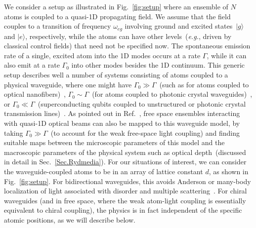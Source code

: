 \documentclass[pra,twocolumn,showpacs,preprintnumbers,amsmath,amssymb]{revtex4-1}
\begin{document}
We consider a setup as illustrated in Fig.~\ref{fig:setup} where an ensemble of  $N$ atoms is coupled to a quasi-1D propagating field. We assume that the field couples to a transition of frequency $\omega_{eg}$ involving ground and excited states~$|g\rangle$ and $|e\rangle$, respectively, while the atoms can have other levels~(\textit{e.g.}, driven by classical control fields) that need not be specified now. The spontaneous emission rate of a single, excited atom into the 1D modes occurs at a rate $\Gamma$, while it can also emit at a rate $\Gamma_0$ into other modes besides the 1D continuum. This generic setup describes well a number of systems consisting of atoms coupled to a physical waveguide, where one might have $\Gamma_0\gg \Gamma$~(such as for atoms coupled to optical nanofibers)~\cite{Prasadnat,ReitzPRL2013,Mitsch2014,Pablo2017}, $\Gamma_0\sim \Gamma$~(for atoms coupled to photonic crystal waveguides)~\cite{Arcari2014,Sollner2015,Goban2014,Hood2016}, or $\Gamma_0\ll \Gamma$~(superconducting qubits coupled to unstructured or photonic crystal transmission lines)~\cite{Sundaresan,painter1,painter2,ustinov,ustinov_topo,marcoBS}. As pointed out in Ref.~\cite{MPSJames}, free space ensembles interacting with quasi-1D optical beams can also be mapped to this waveguide model, by taking $\Gamma_0\gg\Gamma$~(to account for the weak free-space light coupling) and finding suitable maps between the microscopic parameters of this model and the macroscopic parameters of the physical system such as optical depth~(discussed in detail in Sec.~\ref{Sec.Rydmedia}). For our situations of interest, we can consider the waveguide-coupled atoms to be in an array of lattice constant $d$, as shown in Fig.~\ref{fig:setup}. For bidirectional waveguides, this avoids Anderson or many-body localization of light associated with disorder and multiple scattering~\cite{Anderson,ReviewManybodyloc,NikosManybodyloc}. For chiral waveguides (and in free space, where the weak atom-light coupling is essentially equivalent to chiral coupling), the physics is in fact independent of the specific atomic positions, as we will describe below.
\end{document}
